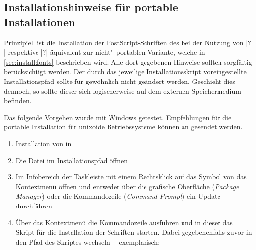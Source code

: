 \subsection{Installationshinweise für portable Installationen}
%
%
Prinzipiell ist die Installation der PostScript-Schriften des \CDs bei der 
Nutzung von |?| respektive  
|?| äquivalent zur nicht"~portablen 
Variante, welche in \autoref{sec:install:fonts} beschrieben wird. Alle dort 
gegebenen Hinweise sollten sorgfältig berücksichtigt werden. Der durch das 
jeweilige Installationsskript voreingestellte Installationspfad sollte für 
gewöhnlich nicht geändert werden. Geschieht dies dennoch, so sollte dieser sich 
logischerweise auf dem externen Speichermedium   
 befinden.

Das folgende Vorgehen wurde mit Windows getestet. Empfehlungen für die portable 
Installation für unixoide Betriebssysteme können an \mailto{\tudscrmail} 
gesendet werden.
\begin{enumerate}
\item Installation von  in 
\item Die Datei  im Installationspfad öffnen
\item Im Infobereich der Taskleiste mit einem Rechtsklick auf das Symbol von 
   das Kontextmenü öffnen und entweder 
  über die grafische Oberfläche (\emph{Package Manager}) oder die Kommandozeile 
  (\emph{Command Prompt}) ein Update durchführen
\item Über das Kontextmenü die Kommandozeile ausführen und in dieser das Skript 
  für die Installation der Schriften  starten. 
  Dabei gegebenenfalls zuvor in den Pfad des Skriptes wechseln~-- exemplarisch:
  \begin{quoting}[leftmargin=1.5em,rightmargin=0pt]
  \newline%
  \,
  \end{quoting}
\end{enumerate}

